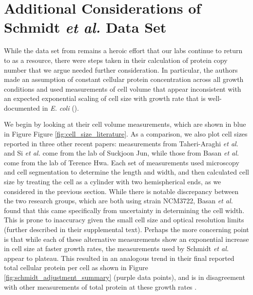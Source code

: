 \section{Additional Considerations of Schmidt \textit{et al.} Data Set}
\label{sec:SI_schmidt}
While the data set from \cite{schmidt2016} remains a heroic effort that our
labs continue to return to as a resource, there were steps taken in their
calculation of protein copy number that we argue needed further
consideration. In particular, the authors made an assumption of constant
cellular protein concentration across all growth conditions and used
measurements of cell volume that appear inconsistent with an expected
exponential scaling of cell size with growth rate that is well-documented in
\textit{E. coli} (\cite{schaechter1958, taheriaraghi2015, si2017}).

We begin by looking at their cell volume measurements, which are shown in blue
in Figure Figure \ref{fig:cell_size_literature}. As a comparison, we also plot cell sizes
reported in three other recent papers: measurements from Taheri-Araghi
\textit{et al.} and Si \textit{et al.} come from the lab of Suckjoon Jun, while
those from Basan \textit{et al.} come  from the lab of Terence Hwa.  Each set of
measurements used microscopy and cell segmentation to determine the length and
width, and then calculated cell size by treating the cell as a cylinder with two
hemispherical ends, as we considered in the previous section. While there is
notable discrepancy between the two research groups, which are both using strain
NCM3722, Basan \textit{et al.} found that this came specifically from
uncertainty in determining the cell width. This is prone to inaccuracy given the
small cell size and optical resolution limits (further described in their
supplemental text). Perhaps the more concerning point is that while each of
these alternative measurements show an exponential increase in  cell size at
faster growth rates, the measurements used by Schmidt \textit{et al.} appear to
plateau. This resulted in an analogous trend in their final reported total
cellular protein per cell as shown in Figure \ref{fig:schmidt_adjustment_summary}
(purple data points), and is in disagreement with other measurements of total
protein at these growth rates \citep{basan2015}.

